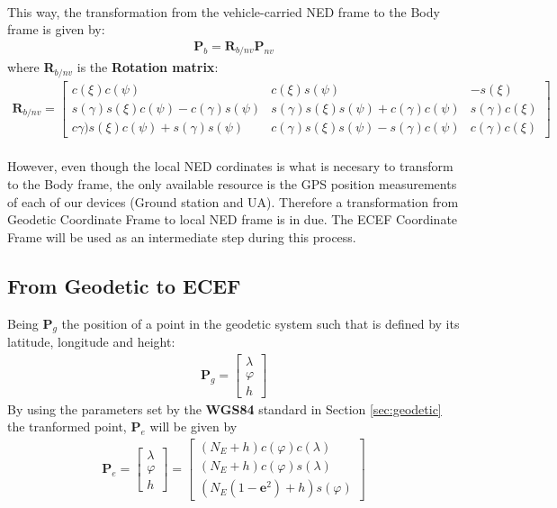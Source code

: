 \paragraph{} This way, the transformation from the vehicle-carried NED frame to the Body frame is given by:
\begin{align}
\textbf{P}_{b} = \textbf{R}_{b/nv}\textbf{P}_{nv}
\end{align}
where \textbf{R}$_{b/nv}$ is the \textbf{Rotation matrix}:
\begin{align*}
\textbf{R}_{b/nv} =
\begin{bmatrix}
c(\xi)c(\psi) & c(\xi)s(\psi) & -s(\xi)\\
s(\gamma)s(\xi)c(\psi) - c(\gamma)s(\psi) & s(\gamma)s(\xi)s(\psi) + c(\gamma)c(\psi) & s(\gamma)c(\xi)\\
c\gamma)s(\xi)c(\psi) + s(\gamma)s(\psi) & c(\gamma)s(\xi)s(\psi) - s(\gamma)c(\psi) & c(\gamma)c(\xi)
\end{bmatrix}
\end{align*}

\paragraph{} However, even though the local NED cordinates is what is necesary to transform to the Body frame, the only available resource  is the GPS position measurements of each of our devices (Ground station and UA). Therefore a transformation from Geodetic Coordinate Frame to local NED frame is in due. The ECEF Coordinate Frame will be used as an intermediate step during this process.

\subsection*{From Geodetic to ECEF}
Being \textbf{P}$_{g}$ the position of a point in the geodetic system such that is defined by its latitude, longitude and height:
\begin{align}
\textbf{P}_{g} = 
\begin{bmatrix}
\lambda \\
\varphi\\
h
\end{bmatrix}
\end{align}
By using the parameters set by the \textbf{WGS84} standard in Section \ref{sec:geodetic} the tranformed point, \textbf{P}$_{e}$ will be given by
\begin{align}
\textbf{P}_{e} = 
\begin{bmatrix}
\lambda \\
\varphi\\
h
\end{bmatrix}
=
\begin{bmatrix}
(N_{E}+h)c(\varphi)c(\lambda) \\
(N_{E}+h)c(\varphi)s(\lambda) \\
(N_{E}(1-\textbf{e}^2)+h)s(\varphi)
\end{bmatrix}
\end{align}

